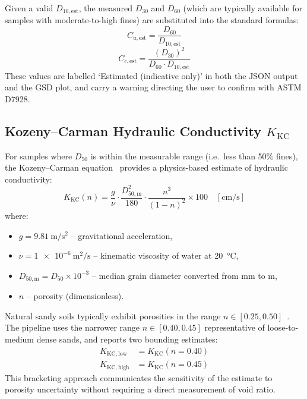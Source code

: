 \documentclass[12pt,a4paper]{article}
\begin{document}
Given a valid $D_{10,\mathrm{est}}$, the measured $D_{30}$ and $D_{60}$
(which are typically available for samples with moderate-to-high fines) are
substituted into the standard formulas:
\begin{equation}
    C_{u,\mathrm{est}} = \frac{D_{60}}{D_{10,\mathrm{est}}}
    \label{eq:cu_est}
\end{equation}
\begin{equation}
    C_{c,\mathrm{est}} = \frac{(D_{30})^2}{D_{60} \cdot D_{10,\mathrm{est}}}
    \label{eq:cc_est}
\end{equation}
These values are labelled \enquote*{Estimated (indicative only)} in both the
JSON output and the GSD plot, and carry a warning directing the user to
confirm with ASTM D7928.

\subsection{Kozeny--Carman Hydraulic Conductivity \texorpdfstring{$K_{\mathrm{KC}}$}{K\_KC}}
\label{sec:kc}

For samples where $D_{50}$ is within the measurable range (i.e.\ less than
50\% fines), the Kozeny--Carman equation~\citep{kozeny1927, carman1937}
provides a physics-based estimate of hydraulic conductivity:
\begin{equation}
    K_{\mathrm{KC}}(n) =
    \frac{g}{\nu}
    \cdot \frac{D_{50,\mathrm{m}}^{2}}{180}
    \cdot \frac{n^3}{(1-n)^2}
    \times 100
    \quad [\si{\centi\metre\per\second}]
    \label{eq:kc}
\end{equation}
where:
\begin{itemize}
    \item $g = \SI{9.81}{\metre\per\second\squared}$ -- gravitational acceleration,
    \item $\nu = \SI{1e-6}{\metre\squared\per\second}$ -- kinematic viscosity of
          water at \SI{20}{\degreeCelsius},
    \item $D_{50,\mathrm{m}} = D_{50} \times 10^{-3}$ -- median grain diameter
          converted from \si{\milli\metre} to \si{\metre},
    \item $n$ -- porosity (dimensionless).
\end{itemize}

Natural sandy soils typically exhibit porosities in the range
$n \in [0.25, 0.50]$~\citep{astm_d2487}.  The pipeline uses the narrower
range $n \in [0.40, 0.45]$ representative of loose-to-medium dense sands,
and reports two bounding estimates:
\begin{align}
    K_{\mathrm{KC,low}}  &= K_{\mathrm{KC}}(n = 0.40)
    \label{eq:kc_low} \\
    K_{\mathrm{KC,high}} &= K_{\mathrm{KC}}(n = 0.45)
    \label{eq:kc_high}
\end{align}
This bracketing approach communicates the sensitivity of the estimate to
porosity uncertainty without requiring a direct measurement of void ratio.
\end{document}
